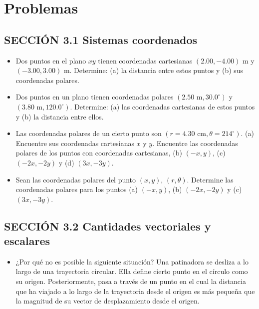 \documentclass[11pt,a4paper]{article}
\begin{document}
\newpage

\section*{Problemas}

\subsection*{SECCIÓN 3.1 Sistemas coordenados}

\begin{itemize}
    \item[\textbf{1.}] Dos puntos en el plano $xy$ tienen coordenadas cartesianas $(2.00, -4.00) \text{ m}$ y $(-3.00, 3.00) \text{ m}$. Determine: (a) la distancia entre estos puntos y (b) sus coordenadas polares.
    \vspace*{6cm}

    \item[\textbf{2.}] Dos puntos en un plano tienen coordenadas polares $(2.50 \text{ m}, 30.0^\circ)$ y $(3.80 \text{ m}, 120.0^\circ)$. Determine: (a) las coordenadas cartesianas de estos puntos y (b) la distancia entre ellos.
    \vspace*{6cm}

    \item[\textbf{3.}] Las coordenadas polares de un cierto punto son $(r = 4.30 \text{ cm}, \theta = 214^\circ)$. (a) Encuentre sus coordenadas cartesianas $x$ y $y$. Encuentre las coordenadas polares de los puntos con coordenadas cartesianas, (b) $(-x, y)$, (c) $(-2x, -2y)$ y (d) $(3x, -3y)$.
    \vspace*{7cm}

    \item[\textbf{4.}] Sean las coordenadas polares del punto $(x, y)$, $(r, \theta)$. Determine las coordenadas polares para los puntos (a) $(-x, y)$, (b) $(-2x, -2y)$ y (c) $(3x, -3y)$.
    \vspace*{6cm}
\end{itemize}

\newpage

\subsection*{SECCIÓN 3.2 Cantidades vectoriales y escalares}

\begin{itemize}
    \item[\textbf{5.}] ¿Por qué no es posible la siguiente situación? Una patinadora se desliza a lo largo de una trayectoria circular. Ella define cierto punto en el círculo como su origen. Posteriormente, pasa a través de un punto en el cual la distancia que ha viajado a lo largo de la trayectoria desde el origen es más pequeña que la magnitud de su vector de desplazamiento desde el origen.
    \vspace*{6cm}
\end{itemize}
\end{document}
